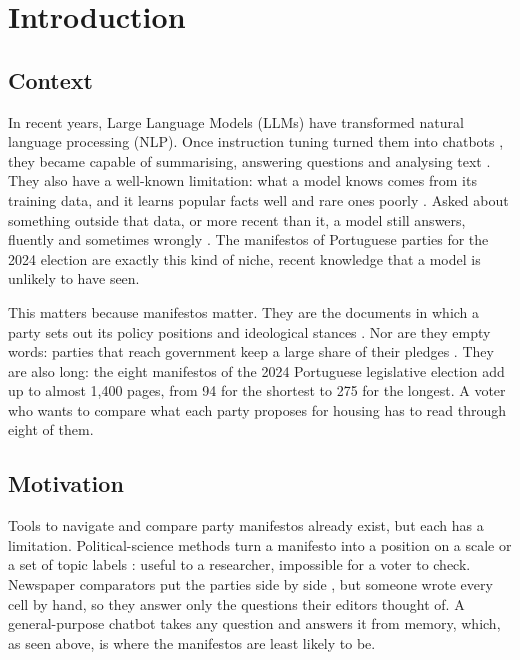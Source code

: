\chapter{Introduction} \label{ch:introduction}

\section{Context}

In recent years, Large Language Models (LLMs) have transformed natural language processing (NLP). Once instruction tuning turned them into chatbots \citep{NEURIPS2022_b1efde53}, they became capable of summarising, answering questions and analysing text \citep{openai2024gpt4technicalreport, yang2023harnessingpowerllmspractice}. They also have a well-known limitation: what a model knows comes from its training data, and it learns popular facts well and rare ones poorly \citep{kandpal2023largelanguagemodelsstruggle}. Asked about something outside that data, or more recent than it, a model still answers, fluently and sometimes wrongly \citep{rag-survey}. The manifestos of Portuguese parties for the 2024 election are exactly this kind of niche, recent knowledge that a model is unlikely to have seen.

This matters because manifestos matter. They are the documents in which a party sets out its policy positions and ideological stances \citep{eder2017manifesto}. Nor are they empty words: parties that reach government keep a large share of their pledges \citep{thomson2017pledges}. They are also long: the eight manifestos of the 2024 Portuguese legislative election add up to almost 1{,}400 pages, from 94 for the shortest to 275 for the longest. A voter who wants to compare what each party proposes for housing has to read through eight of them.

\section{Motivation}

Tools to navigate and compare party manifestos already exist, but each has a limitation. Political-science methods turn a manifesto into a position on a scale or a set of topic labels \citep{laver_benoit_garry, manifestos-nz}: useful to a researcher, impossible for a voter to check. Newspaper comparators put the parties side by side \citep{expresso-comparador, politicaativa-comparar}, but someone wrote every cell by hand, so they answer only the questions their editors thought of. A general-purpose chatbot takes any question and answers it from memory, which, as seen above, is where the manifestos are least likely to be.


